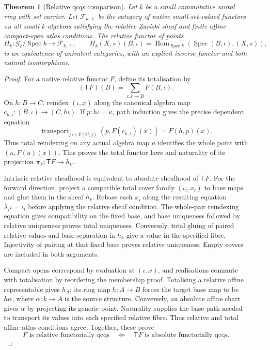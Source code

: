 \documentclass[11pt]{amsart}
\newtheorem{theorem}{Theorem}[section]
\theoremstyle{definition}
\theoremstyle{remark}
\newcommand{\Hom}{\operatorname{Hom}}
\begin{document}
\begin{theorem}[Relative qcqs comparison]\label{thm:relative-comparison}
Let $k$ be a small commutative unital ring with set carrier. Let
$\mathcal F_{k,\ell}$ be the category of native small-set-valued functors
on all small $k$-algebras satisfying the relative Zariski sheaf and finite
affine compact-open atlas conditions. The relative functor of points
\[
 H_k:\mathcal G_\ell/\operatorname{Spec}k
             \longrightarrow\mathcal F_{k,\ell},\qquad
 H_k(X,s)(B,\iota)=\Hom_{\operatorname{Spec}k}
           (\operatorname{Spec}(B,\iota),(X,s)),
\]
is an equivalence of univalent categories, with an explicit inverse
functor and both natural isomorphisms.
\end{theorem}
\begin{proof}
For a native relative functor $F$, define its totalisation by
\[
 (\mathsf T F)(B)=\sum_{\iota:k\to B}F(B,\iota).
\]
On $h:B\to C$, reindex $(\iota,x)$ along the canonical algebra map
$c_{h,\iota}:(B,\iota)\to(C,h\iota)$. If $p:h\iota=\kappa$, path
induction gives the precise dependent equation
\[
 \operatorname{transport}_{j\mapsto F(C,j)}
       (p,F(c_{h,\iota})(x))=F(h,p)(x).
\]
Thus total reindexing on any actual algebra map $a$ identifies the whole
point with $(\kappa,F(a)(x))$. This proves the total functor laws and
naturality of its projection $\pi_F:\mathsf T F\to h_k$.

Intrinsic relative sheafhood is equivalent to absolute sheafhood of
$\mathsf T F$. For the forward direction, project a compatible total
cover family $(\iota_i,x_i)$ to base maps and glue them in the sheaf
$h_k$. Rebase each $x_i$ along the resulting equation
$\lambda_i\iota=\iota_i$ before applying the relative sheaf condition.
The whole-pair reindexing equation gives compatibility on the fixed
base, and base uniqueness followed by relative uniqueness proves total
uniqueness. Conversely, total gluing of paired relative values and base
separation in $h_k$ give a value in the specified fibre. Injectivity of
pairing at that fixed base proves relative uniqueness. Empty covers
are included in both arguments.

Compact opens correspond by evaluation at $(\iota,x)$, and realisations
commute with totalisation by reordering the membership proof. Totalising
a relative affine representable gives $h_A$: its ring map $h:A\to B$
forces the target base map to be $h\alpha$, where $\alpha:k\to A$ is
the source structure. Conversely, an absolute affine chart gives
$\alpha$ by projecting its generic point. Naturality supplies the base
path needed to transport its values into each specified relative
fibre. Thus relative and total affine atlas conditions agree. Together,
these prove
\[
 \text{$F$ is relative functorially qcqs}
 \quad\Longleftrightarrow\quad
 \text{$\mathsf T F$ is absolute functorially qcqs}.
\]


\end{proof}
\end{document}

